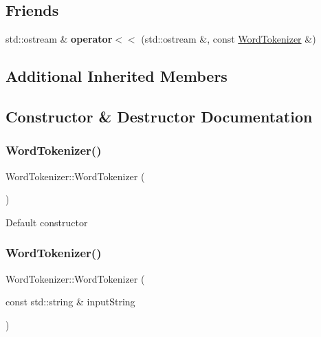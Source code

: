 \subsection*{Friends}
\begin{DoxyCompactItemize}
\item 
\mbox{\label{classWordTokenizer_aa4996c7e6f7338a26da11ab4a0f15b78}} 
std\+::ostream \& {\bfseries operator$<$$<$} (std\+::ostream \&, const \hyperlink{classWordTokenizer}{Word\+Tokenizer} \&)
\end{DoxyCompactItemize}
\subsection*{Additional Inherited Members}


\subsection{Constructor \& Destructor Documentation}
\mbox{\label{classWordTokenizer_a78cfc8455e2b0d99ae070a9d9ef647c8}} 
\subsubsection{\texorpdfstring{Word\+Tokenizer()}{WordTokenizer()}\hspace{0.1cm}{\footnotesize\ttfamily [1/2]}}
{\footnotesize\ttfamily Word\+Tokenizer\+::\+Word\+Tokenizer (\begin{DoxyParamCaption}{ }\end{DoxyParamCaption})}

Default constructor \mbox{\label{classWordTokenizer_ab360e49e4fc162e48060c0811d4d19f8}} 
\subsubsection{\texorpdfstring{Word\+Tokenizer()}{WordTokenizer()}\hspace{0.1cm}{\footnotesize\ttfamily [2/2]}}
{\footnotesize\ttfamily Word\+Tokenizer\+::\+Word\+Tokenizer (\begin{DoxyParamCaption}\item[{const std\+::string \&}]{input\+String }\end{DoxyParamCaption})}

